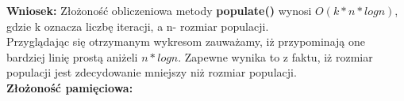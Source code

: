   \textbf{Wniosek:} Złożoność obliczeniowa metody \textbf{populate()} wynosi \textbf{$O(k*n*log n)$}, gdzie k oznacza liczbę iteracji, a n- rozmiar populacji. \\
  Przyglądając się otrzymanym wykresom zauważamy, iż przypominają one bardziej linię prostą aniżeli $n*logn$. Zapewne wynika to z faktu, iż rozmiar populacji jest zdecydowanie mniejszy niż rozmiar populacji.\\
 \textbf{Złożoność pamięciowa: }
